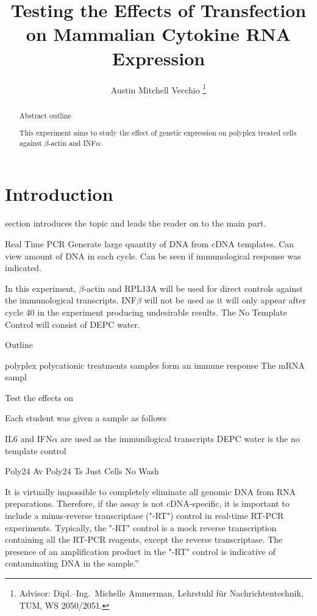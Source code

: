 \documentclass[journal, a4paper]{IEEEtran}
\begin{document}
\title{Testing the Effects of Transfection on Mammalian Cytokine RNA Expression}
\author{Austin Mitchell Vecchio
\thanks{Advisor: Dipl.--Ing.~Michelle Ammerman, Lehrstuhl f\"ur Nachrichtentechnik, TUM, WS 2050/2051.}}
\maketitle

\begin{abstract}
  Abstract outline


  This experiment aims to study the effect of genetic expression on polyplex treated cells against $\beta$-actin and INF$\alpha$.

\end{abstract}

\section{Introduction}
     section introduces the topic and leads the reader on to the main part.

    Real Time PCR
      Generate large quantity of DNA from cDNA templates. Can view amount of DNA in each cycle.
      Can be seen if immunological response was indicated.


      In this experiment, $\beta$-actin and RPL13A will be used for direct controls against the immunological transcripts.
      INF$\beta$ will not be used as it will only appear after cycle 40 in the experiment producing undesirable results.
      The No Template Control will consist of DEPC water.

    Outline

      polyplex polycationic
      treatments
      samples
      form an immune response
    The mRNA sampl

Test the effects on

Each student was given a sample as follows

 IL6 and IFN$\alpha$ are used as the immunilogical transcripts
DEPC water is the no template control

Poly24 Av
Poly24 Ts
Just Cells
No Wash

It is virtually impossible to completely eliminate all genomic DNA from RNA preparations. Therefore, if the assay is not cDNA-specific, it is important to include a minus-reverse transcriptase ("-RT") control in real-time RT-PCR experiments. Typically, the "-RT" control is a mock reverse transcription containing all the RT-PCR reagents, except the reverse transcriptase. The presence of an amplification product in the "-RT" control is indicative of contaminating DNA in the sample.”
\end{document}
